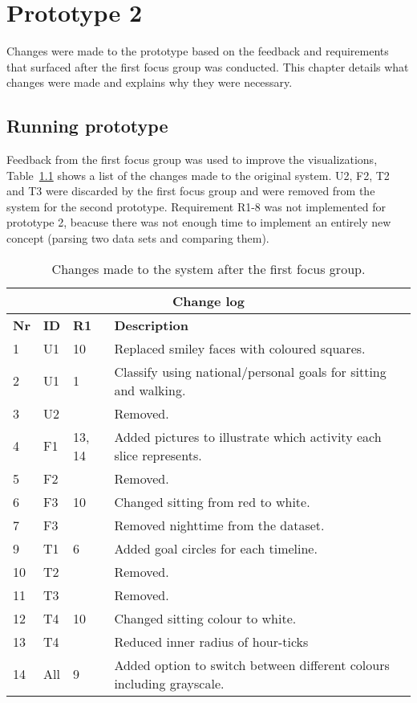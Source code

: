 \chapter{Prototype 2}
\label{ch:prototype2}
Changes were made to the prototype based on the feedback and requirements that surfaced after the first focus group was conducted. This chapter details what changes were made and explains why they were necessary.

\section{Running prototype}
\label{sec:runningPrototype2}
Feedback from the first focus group was used to improve the visualizations, Table~\ref{fig:changeLog} shows a list of the changes made to the original system. U2, F2, T2 and T3 were discarded by the first focus group and were removed from the system for the second prototype. Requirement R1-8 was not implemented for prototype 2, beacuse there was not enough time to implement an entirely new concept (parsing two data sets and comparing them).

\begin{table}[h!]
  \centering
  \begin{tabular}{|l|l|l|p{8cm}|}
      \multicolumn{4}{c}{\textbf{Change log}} \\ \hline
      \textbf{Nr} & \textbf{ID} & \textbf{R1} & \textbf{Description} \\ \hline
      1  & U1  & 10       & Replaced smiley faces with coloured squares. \\ \hline
      2  & U1  & 1        & Classify using national/personal goals for sitting and walking.\\ \hline 
      3  & U2  &             & Removed. \\ \hline
      4  & F1  & 13, 14 & Added pictures to illustrate which activity each slice represents. \\ \hline
      5  & F2  &             & Removed. \\ \hline 
      6  & F3  & 10       & Changed sitting from red to white. \\ \hline
      7  & F3  &             & Removed nighttime from the dataset. \\ \hline
      9  & T1  & 6        & Added goal circles for each timeline. \\ \hline
      10 & T2  &             & Removed. \\ \hline
      11 & T3  &             & Removed. \\ \hline
      12 & T4  & 10       & Changed sitting colour to white. \\ \hline
      13 & T4  &             & Reduced inner radius of hour-ticks \\ \hline
      14 & All & 9        & Added option to switch between different colours including grayscale. \\ \hline
  \end{tabular}
  \caption{Changes made to the system after the first focus group.}
  \label{fig:changeLog}
\end{table}

